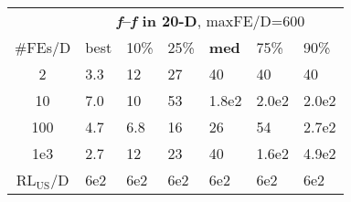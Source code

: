 \begin{tabular}{c|llllll}
 & \multicolumn{6}{|c}{\textbf{\textit{f}\raisebox{-0.35ex}{1}--\textit{f}\raisebox{-0.35ex}{24} in 20-D}, maxFE/D=600}\\
\#FEs/D & best & 10\% & 25\% & \textbf{med} & 75\% & 90\%\\
2 & \hspace*{1ex}3.3 & 12 & 27 & 40 & 40 & 40\\
10 & \hspace*{1ex}7.0 & 10 & 53 & 1.8e2 & 2.0e2 & 2.0e2\\
100 & \hspace*{1ex}4.7 & \hspace*{1ex}6.8 & 16 & 26 & 54 & 2.7e2\\
1e3 & \hspace*{1ex}2.7 & 12 & 23 & 40 & 1.6e2 & 4.9e2\\
$\text{RL}_{\text{US}}$/D & 6e2 & 6e2 & 6e2 & 6e2 & 6e2 & 6e2
\end{tabular}
